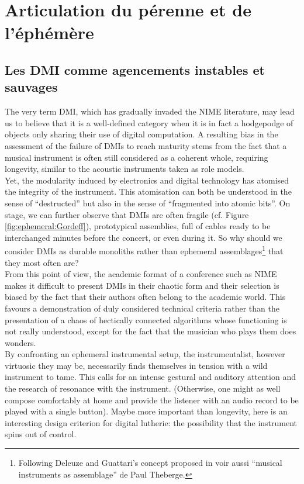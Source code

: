 \section{Articulation du pérenne et de l'éphémère}

\subsection{Les DMI comme agencements instables et sauvages}

The very term DMI, which has gradually invaded the NIME literature, may lead us to believe that it is a well-defined category when it is in fact a hodgepodge of objects only sharing their use of digital computation. A resulting bias in the assessment of the failure of DMIs to reach maturity stems from the fact that a musical instrument is often still considered as a coherent whole, requiring longevity, similar to the acoustic instruments taken as role models.\\
\indent Yet, the modularity induced by electronics and digital technology has atomised the integrity of the instrument. This atomisation can both be understood in the sense of “destructed” but also in the sense of “fragmented into atomic bits”. On stage, we can further observe that DMIs are often fragile (cf. Figure \ref{fig:ephemeral:Gordeff}), prototypical assemblies, full of cables ready to be interchanged minutes before the concert, or even during it. So why should we consider DMIs as durable monoliths rather than ephemeral assemblages\footnote{Following Deleuze and Guattari's concept proposed in \cite{deleuze_mille_1980} voir aussi ``musical instruments as assemblage'' de Paul Theberge.} that they most often are?\\
\indent From this point of view, the academic format of a conference such as NIME makes it difficult to present DMIs in their chaotic form and their selection is biased by the fact that their authors often belong to the academic world. This favours a demonstration of duly considered technical criteria rather than the presentation of a chaos of hectically connected algorithms whose functioning is not really understood, except for the fact that the musician who plays them does wonders.\\
\indent By confronting an ephemeral instrumental setup, the instrumentalist, however virtuosic they may be, necessarily finds themselves in tension with a wild instrument to tame. This calls for an intense gestural and auditory attention and the research of resonance with the instrument. (Otherwise, one might as well compose comfortably at home and provide the listener with an audio record to be played with a single button). Maybe more important than longevity, here is an interesting design criterion for digital lutherie: the possibility that the instrument spins out of control.

